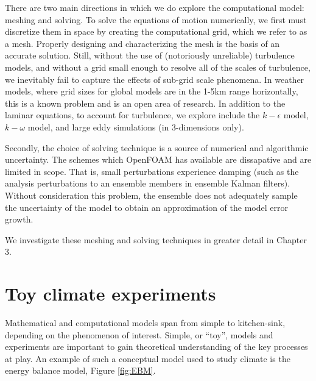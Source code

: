 \documentclass[12pt]{report}
\begin{document}
There are two main directions in which we do explore the computational model: meshing and solving.
To solve the equations of motion numerically, we first must discretize them in space by creating the computational grid, which we refer to as a mesh.
Properly designing and characterizing the mesh is the basis of an accurate solution.
Still, without the use of (notoriously unreliable) turbulence models, and without a grid small enough to resolve all of the scales of turbulence, we inevitably fail to capture the effects of sub-grid scale phenomena.
In weather models, where grid sizes for global models are in the 1-5km range horizontally, this is a known problem and is an open area of research.
In addition to the laminar equations, to account for turbulence, we explore include the $k-\epsilon$ model, $k-\omega$ model, and large eddy simulations (in 3-dimensions only).

Secondly, the choice of solving technique is a source of numerical and algorithmic uncertainty.
The schemes which OpenFOAM has available are dissapative and are limited in scope.
That is, small perturbations experience damping (such as the analysis perturbations to an ensemble members in ensemble Kalman filters).
Without consideration this problem, the ensemble does not adequately sample the uncertainty of the model to obtain an approximation of the model error growth.

We investigate these meshing and solving techniques in greater detail in Chapter 3.

\section{Toy climate experiments}

Mathematical and computational models span from simple to kitchen-sink, depending on the phenomenon of interest.
Simple, or ``toy'', models and experiments are important to gain theoretical understanding of the key processes at play.
An example of such a conceptual model used to study climate is the energy balance model, Figure \ref{fig:EBM}.
\end{document}

